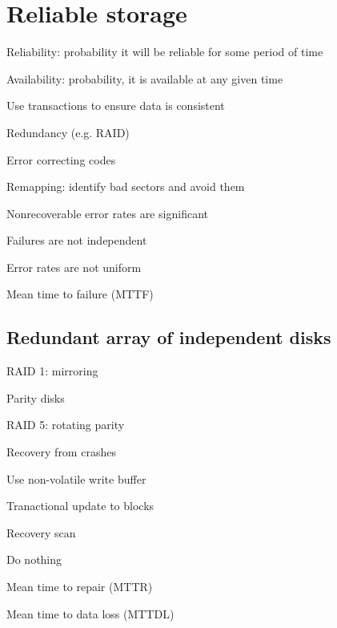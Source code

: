 \section{Reliable storage}
\enumstart
	\item Reliability: probability it will be reliable for some period of time
	\item Availability: probability, it is available at any given time
	\item Use transactions to ensure data is consistent
	\item Redundancy (e.g. RAID)
	\item Error correcting codes
	\item Remapping: identify bad sectors and avoid them
	\item Nonrecoverable error rates are significant
	\item Failures are not independent
	\item Error rates are not uniform
	\item Mean time to failure (MTTF)
\enumend

\subsection{Redundant array of independent disks}
\enumstart
	\item RAID 1: mirroring
	\item Parity disks
	\item RAID 5: rotating parity
	\item Recovery from crashes
	\enumstart
		\item Use non-volatile write buffer
		\item Tranactional update to blocks
		\item Recovery scan
		\item Do nothing
	\enumend
	\item Mean time to repair (MTTR)
	\item Mean time to data loss (MTTDL)
\enumend
